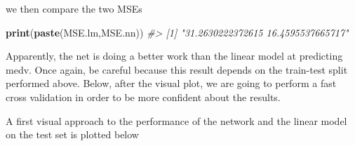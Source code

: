 \documentclass[]{book}
\newenvironment{Shaded}{\begin{snugshade}}{\end{snugshade}}
\newcommand{\CommentTok}[1]{\textcolor[rgb]{0.56,0.35,0.01}{\textit{#1}}}
\newcommand{\DataTypeTok}[1]{\textcolor[rgb]{0.13,0.29,0.53}{#1}}
\newcommand{\DecValTok}[1]{\textcolor[rgb]{0.00,0.00,0.81}{#1}}
\newcommand{\FloatTok}[1]{\textcolor[rgb]{0.00,0.00,0.81}{#1}}
\newcommand{\KeywordTok}[1]{\textcolor[rgb]{0.13,0.29,0.53}{\textbf{#1}}}
\newcommand{\NormalTok}[1]{#1}
\newcommand{\OperatorTok}[1]{\textcolor[rgb]{0.81,0.36,0.00}{\textbf{#1}}}
\newcommand{\StringTok}[1]{\textcolor[rgb]{0.31,0.60,0.02}{#1}}
\begin{document}
we then compare the two MSEs

\begin{Shaded}
\begin{Highlighting}[]
\KeywordTok{print}\NormalTok{(}\KeywordTok{paste}\NormalTok{(MSE.lm,MSE.nn))}
\CommentTok{#> [1] "31.2630222372615 16.4595537665717"}
\end{Highlighting}
\end{Shaded}

Apparently, the net is doing a better work than the linear model at predicting medv. Once again, be careful because this result depends on the train-test split performed above. Below, after the visual plot, we are going to perform a fast cross validation in order to be more confident about the results.

A first visual approach to the performance of the network and the linear model on the test set is plotted below

\begin{Shaded}
\end{Shaded}
\end{document}
